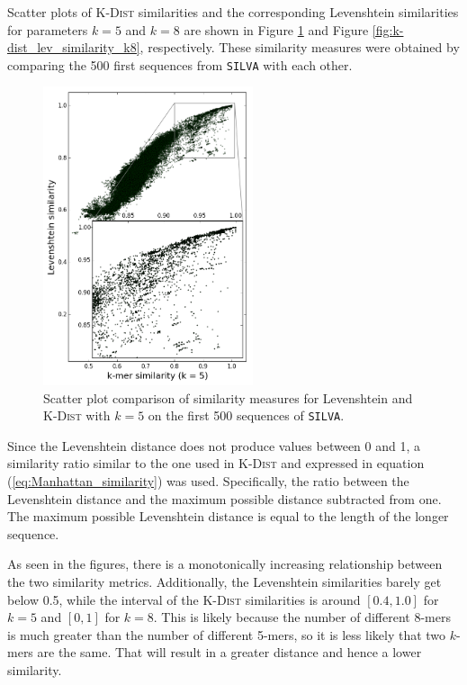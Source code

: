 Scatter plots of \textsc{K-Dist} similarities and the corresponding Levenshtein
similarities for parameters $k=5$ and $k=8$ are shown in Figure
\ref{fig:k-dist_lev_similarity_k5} and Figure
\ref{fig:k-dist_lev_similarity_k8}, respectively. These similarity measures
were obtained by comparing the 500 first sequences from \texttt{SILVA} with
each other.

\begin{figure}
  \includegraphics[width=0.55\textwidth]{graphics/Levenshtein_K-Dist_k5.png}
  \caption{Scatter plot comparison of similarity measures for Levenshtein and
    \textsc{K-Dist} with $k=5$ on the first 500 sequences of \texttt{SILVA}.}
  \label{fig:k-dist_lev_similarity_k5}
\end{figure}

Since the Levenshtein distance does not produce values between 0 and 1, a
similarity ratio similar to the one used in \textsc{K-Dist} and expressed in
equation (\ref{eq:Manhattan_similarity}) was used. Specifically, the ratio
between the Levenshtein distance and the maximum possible distance subtracted
from one. The maximum possible Levenshtein distance is equal to the length of
the longer sequence.

As seen in the figures, there is a monotonically increasing relationship
between the two similarity metrics. Additionally, the Levenshtein similarities
barely get below 0.5, while the interval of the \textsc{K-Dist} similarities is
around $[0.4,1.0]$ for $k=5$ and $[0,1]$ for $k=8$. This is likely because the
number of different 8-mers is much greater than the number of different 5-mers,
so it is less likely that two $k$-mers are the same. That will result in a
greater distance and hence a lower similarity.


